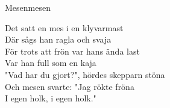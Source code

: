 \begin{song}{Mesen}{mesen}
\begin{vers}
Det satt en mes i en klyvarmast\\
Där sågs han ragla och svaja\\
För trots att frön var hans ända last\\
Var han full som en kaja\\
"Vad har du gjort?", hördes skepparn stöna\\
Och mesen svarte: "Jag rökte fröna\\
I egen holk, i egen holk."\\
\end{vers}
\end{song}
